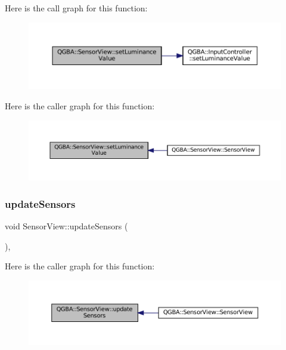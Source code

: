 Here is the call graph for this function\+:
\nopagebreak
\begin{figure}[H]
\begin{center}
\leavevmode
\includegraphics[width=350pt]{class_q_g_b_a_1_1_sensor_view_ad6dec39ee47c69c736c18293da18527c_cgraph}
\end{center}
\end{figure}
Here is the caller graph for this function\+:
\nopagebreak
\begin{figure}[H]
\begin{center}
\leavevmode
\includegraphics[width=350pt]{class_q_g_b_a_1_1_sensor_view_ad6dec39ee47c69c736c18293da18527c_icgraph}
\end{center}
\end{figure}
\mbox{\label{class_q_g_b_a_1_1_sensor_view_aa80d32096bbd1abb428d05cf4124c1ba}} 
\subsubsection{\texorpdfstring{update\+Sensors}{updateSensors}}
{\footnotesize\ttfamily void Sensor\+View\+::update\+Sensors (\begin{DoxyParamCaption}{ }\end{DoxyParamCaption})\hspace{0.3cm}{\ttfamily [private]}, {\ttfamily [slot]}}

Here is the caller graph for this function\+:
\nopagebreak
\begin{figure}[H]
\begin{center}
\leavevmode
\includegraphics[width=350pt]{class_q_g_b_a_1_1_sensor_view_aa80d32096bbd1abb428d05cf4124c1ba_icgraph}
\end{center}
\end{figure}


